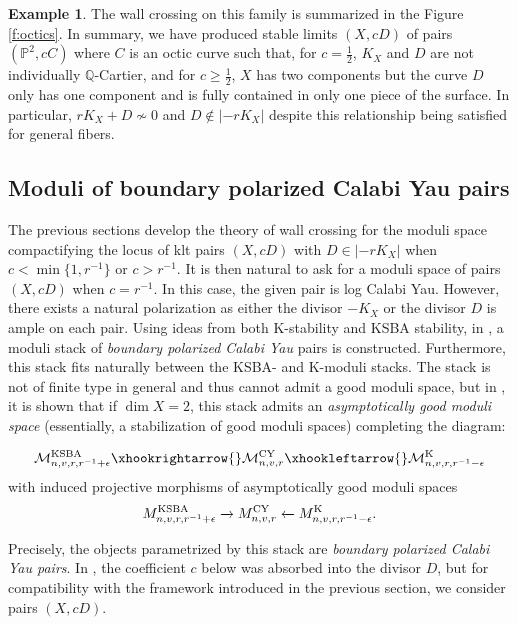 \documentclass[11pt]{amsart}
\numberwithin{equation}{section}
\theoremstyle{definition}
\newtheorem{example}[theorem]{Example}
\newcommand{\bQ}{\mathbb{Q}}
\newcommand{\KSBA}{{\rm KSBA}}
\newcommand{\bP}{\mathbb{P}}
\newcommand{\cM}{\mathcal M}
\newcommand{\K}{\mathrm{K}}
\begin{document}
\begin{example}
        The wall crossing on this family is summarized in the Figure \ref{f:octics}. In summary, we have produced stable limits $(X, cD)$ of pairs $(\bP^2, cC)$ where $C$ is an octic curve such that, for $c = \frac{1}{2}$, $K_X$ and $D$ are not individually $\bQ$-Cartier, and for $c \ge \frac{1}{2}$, $X$ has two components but the curve $D$ only has one component and is fully contained in only one piece of the surface.  In particular, $rK_X + D \not \sim 0$ and $D \notin |-rK_X|$ despite this relationship being satisfied for general fibers.  
\end{example}

\subsection{Moduli of boundary polarized Calabi Yau pairs}\label{ss:bpcy}

The previous sections develop the theory of wall crossing for the moduli space compactifying the locus of klt pairs $(X,cD)$ with $D \in |- rK_X|$ when $c < \min\{1, r^{-1}\}$ or $c > r^{-1}$.  It is then natural to ask for a moduli space of pairs $(X,cD)$ when $c = r^{-1}$.  In this case, the given pair is log Calabi Yau.  However, there exists a natural polarization as either the divisor $-K_X$ or the divisor $D$ is ample on each pair.  Using ideas from both K-stability and KSBA stability, in \cite{BABWILD}, a moduli stack of \textit{boundary polarized Calabi Yau} pairs is constructed.  Furthermore, this stack fits naturally between the KSBA- and K-moduli stacks.  The stack is not of finite type in general and thus cannot admit a good moduli space, but in \cite{BABWILD, BL}, it is shown that if $\dim X = 2$, this stack admits an \textit{asymptotically good moduli space} (essentially, a stabilization of good moduli spaces) completing the diagram: 

 \[
 \cM^\KSBA_{n,v,r,r^{-1}+\epsilon}\xhookrightarrow{}
 \cM^{\rm CY}_{n,v,r}\xhookleftarrow{}\cM^\K_{n,v,r,r^{-1}-\epsilon}
 \]
 with induced projective morphisms of asymptotically good moduli spaces
 \[
 M^\KSBA_{n,v,r,r^{-1}+\epsilon}\xrightarrow{}
 M^{\rm CY}_{n,v,r}\xleftarrow{}M^\K_{n,v,r,r^{-1}-\epsilon}.
 \]

Precisely, the objects parametrized by this stack are \textit{boundary polarized Calabi Yau pairs}. In \cite{BABWILD}, the coefficient $c$ below was absorbed into the divisor $D$, but for compatibility with the framework introduced in the previous section, we consider pairs $(X,cD)$.
\end{document}
